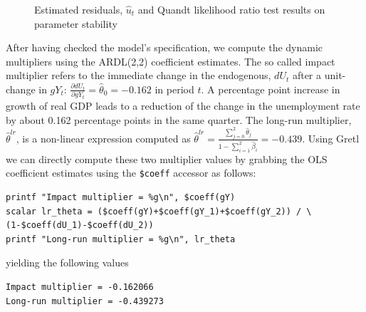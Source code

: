 \documentclass[11pt]{article}
\begin{document}
\begin{figure}[h!]
	\centering
	\caption{Estimated residuals, $ \hat u_t $ and Quandt likelihood ratio test results on parameter stability}
	\label{fig:QLR}
\end{figure}

After having checked the model's specification, we compute the dynamic multipliers using the ARDL(2,2) coefficient estimates. The so called impact multiplier refers to the immediate change in the endogenous, $ dU_t $ after a unit-change in $ gY_t $: $ \frac{\partial dU_t}{\partial gY_t} = \hat \theta_0 = -0.162$ in period $ t $. A percentage point increase in growth of real GDP leads to a reduction of the change in the unemployment rate by about 0.162 percentage points in the same quarter. The long-run multiplier, $ \hat \theta^{lr}$, is a non-linear expression computed as $ \hat \theta^{lr} = \frac{\sum_{j=0}^2 \hat \theta_j}{1-\sum_{i=1}^{2} \hat \beta_i} = -0.439$. Using Gretl we can directly compute these two multiplier values by grabbing the OLS coefficient estimates using the \texttt{\$coeff} accessor as follows:

\begin{Verbatim}[baselinestretch=0.75, fontsize=\small]
printf "Impact multiplier = %g\n", $coeff(gY)
scalar lr_theta = ($coeff(gY)+$coeff(gY_1)+$coeff(gY_2)) / \
(1-$coeff(dU_1)-$coeff(dU_2))
printf "Long-run multiplier = %g\n", lr_theta
\end{Verbatim}
yielding the following values
\begin{Verbatim}[baselinestretch=0.75, fontsize=\small]
Impact multiplier = -0.162066
Long-run multiplier = -0.439273
\end{Verbatim}
\end{document}
